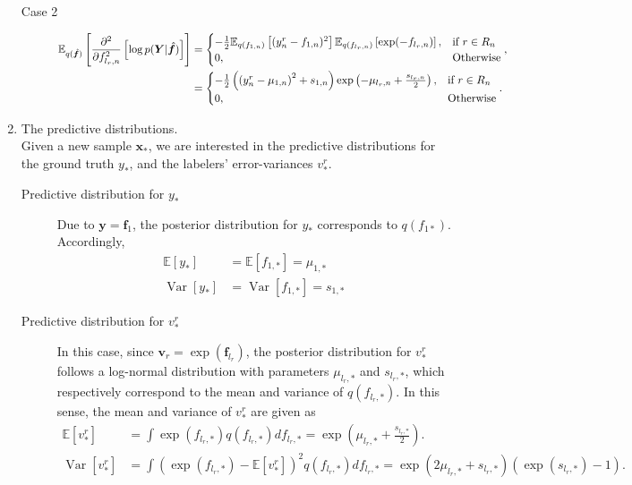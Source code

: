 \documentclass[9pt]{article}
\providecommand{\ve}[1]{{\bm{#1}}}%
\providecommand{\mat}[1]{{\bm{#1}}} %
\providecommand{\ve}[1]{{\mathbf{#1}}}
\providecommand{\mat}[1]{{\mathbf{#1}}}
\newcommand{\fracpartial}[2]{\frac{\partial #1}{\partial  #2}} %
\begin{document}
\begin{enumerate}
\begin{description}
	\item[Case 2] 
	\begin{align}
	\notag \mathbb{E}_{q(\hat{\ve{f}})}\left[\fracpartial{^2}{f_{l_r,n}^2}\left[\log p(\mat{Y}|\hat{\ve{f}})\right]\right] &= \begin{cases}
	-\frac{1}{2}\mathbb{E}_{q(f_{1,n})}\left[(y_n^r - f_{1,n})^2\right]\mathbb{E}_{q(f_{l_r,n})}\left[\exp(-f_{l_r,n})\right], & \mbox{if $r\in R_n$}\\
	0, & \mbox{Otherwise}
	\end{cases},\\
	&= \begin{cases}
	-\frac{1}{2}\left(\left(y_n^r - \mu_{1,n}\right)^2 + s_{1,n}\right)\exp\left(-\mu_{l_r,n} + \frac{s_{l_r,n}}{2} \right), & \mbox{if $r\in R_n$}\\
	0, & \mbox{Otherwise}
	\end{cases}.
	\end{align}
	
\end{description}
\item The predictive distributions.\\
Given a new sample $\ve{x}_{*}$, we are interested in the predictive distributions for the ground truth $y_{*}$, and the labelers' error-variances $v_{*}^r$.
\begin{description}
    \item[Predictive distribution for $y_{*}$] Due to $\mathbf{y} = \mathbf{f}_{1}$, the posterior distribution for $y_*$ corresponds to $q(f_{1*})$. Accordingly,
    \begin{align}
        \mathbb{E}[y_{*}] &= \mathbb{E}[f_{1,*}] = \mu_{1,*}\\
        \operatorname{Var}[y_{*}] &= \operatorname{Var}[f_{1,*}] = s_{1,*}
    \end{align}
    \item[Predictive distribution for $v_{*}^r$] In this case, since $\mathbf{v}_{r} = \exp(\mathbf{f}_{l_r})$, the posterior distribution for $v_{*}^r$ follows a log-normal distribution with parameters $\mu_{l_r,*}$ and $s_{l_r,*}$, which respectively correspond to the mean and variance of $q(f_{l_r,*})$. In this sense, the mean and variance of $v_{*}^r$ are given as
    \begin{align}
        \mathbb{E}[v_{*}^r] &= \int \exp(f_{l_r,*}) q(f_{l_r,*})df_{l_r,*} = \exp\left(\mu_{l_r,*} + \frac{s_{l_r,*}}{2}\right).\\
        \operatorname{Var}[v_{*}^r] &= \int \left(\exp(f_{l_r,*})-\mathbb{E}[v_{*}^r]\right)^2 q(f_{l_r,*})df_{l_r,*} = \exp\left(2\mu_{l_r,*} + s_{l_r,*}\right)\left(\exp(s_{l_r,*}) - 1\right).
    \end{align}
\end{description}
\end{enumerate}
\end{document}
